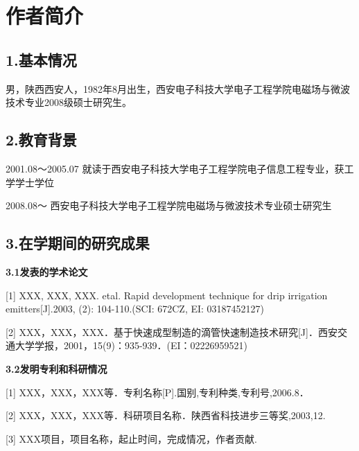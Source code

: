 
\chapter*{作者简介}

\section*{\textbf{1.基本情况}}
男，陕西西安人，1982年8月出生，西安电子科技大学电子工程学院电磁场与微波技术专业2008级硕士研究生。

\section*{\textbf{2.教育背景}}
2001.08～2005.07  就读于西安电子科技大学电子工程学院电子信息工程专业，获工学学士学位

2008.08～        西安电子科技大学电子工程学院电磁场与微波技术专业硕士研究生

\section*{\textbf{3.在学期间的研究成果}}
\textbf{3.1发表的学术论文}

[1] XXX, XXX, XXX. etal. Rapid development technique for drip irrigation emitters[J].2003, (2): 104-110.(SCI: 672CZ, EI: 03187452127)

[2] XXX，XXX，XXX．基于快速成型制造的滴管快速制造技术研究[J]．西安交通大学学报，2001，15(9)：935-939．(EI：02226959521)

\textbf{3.2发明专利和科研情况}

[1] XXX，XXX，XXX等．专利名称[P].国别,专利种类,专利号,2006.8．

[2] XXX，XXX，XXX等．科研项目名称．陕西省科技进步三等奖,2003,12.

[3] XXX项目，项目名称，起止时间，完成情况，作者贡献.



